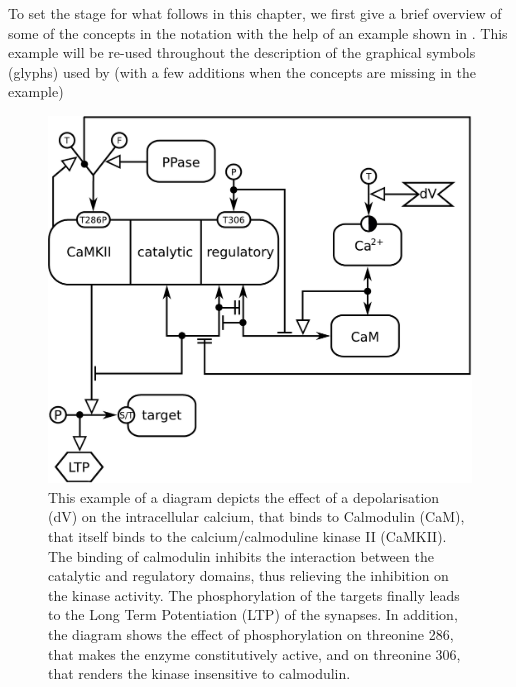 
To set the stage for what follows in this chapter, we first give a brief overview of some of the concepts in the \ER notation with the help of an example shown in . This example will be re-used throughout the description of the graphical symbols (glyphs) used by \SBGNERLone (with a few additions when the concepts are missing in the example) 

\begin{figure}[H]
  \centering
  \vspace*{-0.75em}
  \includegraphics[scale=0.6]{examples/CaMKII-intro}
   \caption{This example of a \ER diagram depicts the effect of a depolarisation (dV) on the intracellular calcium, that binds to Calmodulin (CaM), that itself binds to the calcium/calmoduline kinase II (CaMKII). The binding of calmodulin inhibits the interaction between the catalytic and regulatory domains, thus relieving the inhibition on the kinase activity. The phosphorylation of the targets finally leads to the Long Term Potentiation (LTP) of the synapses. In addition, the diagram shows the effect of phosphorylation on threonine 286, that makes the enzyme constitutively active, and on threonine 306, that renders the kinase insensitive to calmodulin.}
  \label{fig:eg1}
\end{figure}
 
